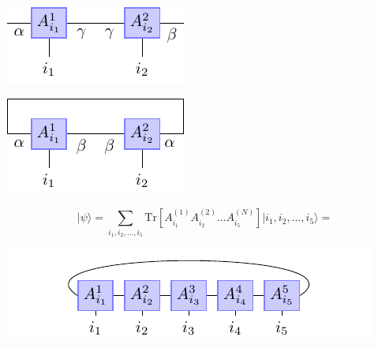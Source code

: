 \documentclass[a0,portrait]{a0poster}
\newcommand{\ket}[1]{\vert #1 \rangle}
\newcommand{\Tr}{\mathrm{Tr}}
\begin{document}
\begin{multicols}{3}
\begin{minipage}[m]{0.45\linewidth}
	\centering
	\includegraphics[width=0.6\linewidth]{mps-vertex-product}
	\label{fig:mps-vertex-product}
\end{minipage}
\begin{minipage}[m]{0.45\linewidth}
	\centering
	\includegraphics[width=0.6\linewidth]{mps-vertex-product-trace}
	\label{fig:mps-vertex-product-trace}
\end{minipage}

\begin{minipage}[m]{0.3\columnwidth}
	$$ \ket{\psi} = \sum_{i_1, i_2, \ldots, i_5} \Tr\left[ A^{(1)}_{i_1} A^{(2)}_{i_2} \ldots A^{(N)}_{i_5} \right] \ket{i_1, i_2, \ldots, i_5} = $$
\end{minipage}
\begin{minipage}[m]{0.4\columnwidth}
	\hspace*{8cm}\includegraphics[width=1.0\linewidth]{mps-state}
\end{minipage}


\end{multicols}
\end{document}
